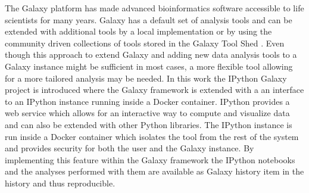 \documentclass{bioinfo}
\begin{document}
The Galaxy platform \citep{Blank2010,Giardine2005,Goecks2010} has made advanced bioinformatics software accessible to life scientists for many years. Galaxy has a default set of analysis tools and can be extended with additional tools by a local implementation or by using the community driven collections of tools stored in the Galaxy Tool Shed \citep{Blankenber2014}. Even though this approach to extend Galaxy and adding new data analysis tools to a Galaxy instance might be sufficient in most cases, a more flexible tool allowing for a more tailored analysis may be needed. In this work the IPython Galaxy project is introduced where the Galaxy framework is extended with a an interface to an IPython \citep{Perez2007} instance running inside a Docker container. IPython provides a web service which allows for an interactive way to compute and visualize data and can also be extended with other Python libraries. The IPython instance is run inside a Docker container which isolates the tool from the rest of the system and provides security for both the user and the Galaxy instance. By implementing this feature within the Galaxy framework the IPython notebooks and the analyses performed with them are available as Galaxy history item in the history and thus reproducible. 
\end{document}
